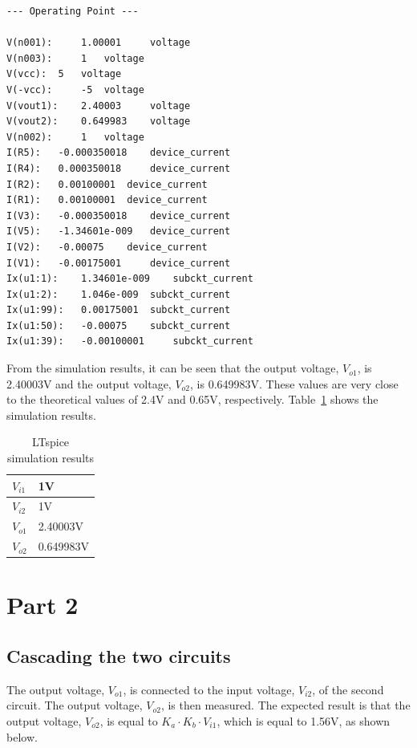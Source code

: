 \documentclass{zc-ust-hw}
\begin{document}
\begin{lstlisting}[caption=LTspice simulation results of the two circuits, label=lst:1]
       --- Operating Point ---

V(n001):	 1.00001	 voltage
V(n003):	 1	 voltage
V(vcc):	 5	 voltage
V(-vcc):	 -5	 voltage
V(vout1):	 2.40003	 voltage
V(vout2):	 0.649983	 voltage
V(n002):	 1	 voltage
I(R5):	 -0.000350018	 device_current
I(R4):	 0.000350018	 device_current
I(R2):	 0.00100001	 device_current
I(R1):	 0.00100001	 device_current
I(V3):	 -0.000350018	 device_current
I(V5):	 -1.34601e-009	 device_current
I(V2):	 -0.00075	 device_current
I(V1):	 -0.00175001	 device_current
Ix(u1:1):	 1.34601e-009	 subckt_current
Ix(u1:2):	 1.046e-009	 subckt_current
Ix(u1:99):	 0.00175001	 subckt_current
Ix(u1:50):	 -0.00075	 subckt_current
Ix(u1:39):	 -0.00100001	 subckt_current
\end{lstlisting}

From the simulation results, it can be seen that the output voltage, $V_{o1}$,
is 2.40003V and the output voltage, $V_{o2}$, is 0.649983V. These values are
very close to the theoretical values of 2.4V and 0.65V, respectively.
Table~\ref{tab:2} shows the simulation results.
 
\begin{table}[htpb]
  \caption{LTspice simulation results}\label{tab:2}
  \begin{center}
    \begin{tabular}[c]{|l|l|}
      \hline
      $V_{i1}$ & 1V \\
      \hline
      $V_{i2}$ & 1V \\
      \hline
      $V_{o1}$ & 2.40003V \\
      \hline
      $V_{o2}$ & 0.649983V \\
      \hline
    \end{tabular}
  \end{center}
\end{table}

\section{Part 2}

\subsection{Cascading the two circuits}

The output voltage, $V_{o1}$, is connected to the input voltage, $V_{i2}$, of
the second circuit. The output voltage, $V_{o2}$, is then measured. The
expected result is that the output voltage, $V_{o2}$, is equal to $K_a \cdot
K_b \cdot V_{i1}$, which is equal to 1.56V, as shown below.
\end{document}
